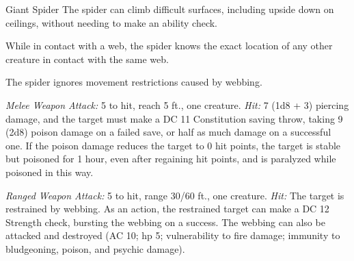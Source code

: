 \documentclass[10pt,a4paper,twoside,bg=print,twocolumn,openany,nodeprecatedcode]{dndbook}
\begin{document}
\begin{DndMonster}[float=t]{Giant Spider}
\DndMonsterBasics[
armor-class = {14 (natural armor)},
hit-points = {\DndDice{4d10 + 4}},
speed = {30 ft., climb 30 ft.}
]
\DndMonsterAbilityScores[
 str = 14,
 dex = 16,
 con = 12,
 int = 2,
 wis = 11,
 cha = 4
]
\DndMonsterDetails[
skills = {Stealth +7},
senses = {blindsight 10 ft., darkvision 60 ft., passive perception 10},
challenge = 1,
]
The spider can climb difficult surfaces, including upside down on ceilings, without needing to make an ability check.

While in contact with a web, the spider knows the exact location of any other creature in contact with the same web.

The spider ignores movement restrictions caused by webbing.

\textsl{Melee Weapon Attack:} 5 to hit, reach 5 ft., one creature. \textsl{Hit:} 7 (1d8 + 3) piercing damage, and the target must make a DC 11 Constitution saving throw, taking 9 (2d8) poison damage on a failed save, or half as much damage on a successful one. If the poison damage reduces the target to 0 hit points, the target is stable but poisoned for 1 hour, even after regaining hit points, and is paralyzed while poisoned in this way.

\textsl{Ranged Weapon Attack:} 5 to hit, range 30/60 ft., one creature. \textsl{Hit:} The target is restrained by webbing. As an action, the restrained target can make a DC 12 Strength check, bursting the webbing on a success. The webbing can also be attacked and destroyed (AC 10; hp 5; vulnerability to fire damage; immunity to bludgeoning, poison, and psychic damage).

\end{DndMonster}
\end{document}
